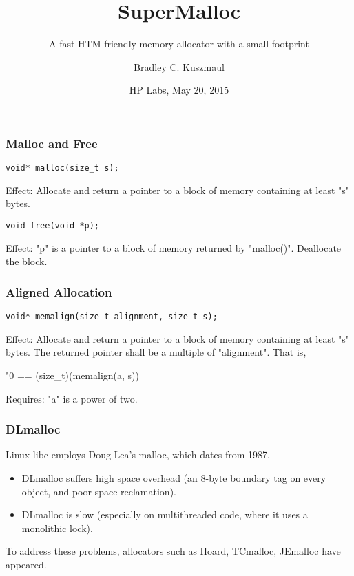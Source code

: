 \documentclass[xcolor=dvipsnames,14pt]{beamer}
\begin{document}
\title{SuperMalloc}
\subtitle{A fast HTM-friendly memory allocator with a small footprint}



\author{Bradley C. Kuszmaul}
\date{HP Labs, May  20, 2015}
\frame{\titlepage}

\begin{frame}[fragile]
\frametitle{Malloc and Free}
\begin{verbatim}
void* malloc(size_t s);
\end{verbatim}

Effect: Allocate and return a pointer to a block of memory containing at least "s" bytes.

\begin{verbatim}
void free(void *p);
\end{verbatim}

Effect: "p" is a pointer to a block of memory returned by "malloc()".  Deallocate the block.
\end{frame}

\begin{frame}[fragile]
\frametitle{Aligned Allocation}

\begin{verbatim}
void* memalign(size_t alignment, size_t s);
\end{verbatim}


Effect: Allocate and return a pointer to a block of memory containing at least "s" bytes.  
The returned pointer shall be a multiple of "alignment".  That is,
\begin{center}
"0 == (size_t)(memalign(a, s)) %
\end{center}

Requires: "a" is a power of two.
\end{frame}

\begin{frame}
\frametitle{DLmalloc}

Linux libc employs Doug Lea's malloc, which dates from 1987.

\begin{itemize}
\item DLmalloc suffers high space overhead (an 8-byte boundary tag on every object, and poor space reclamation).
\item DLmalloc is slow (especially on multithreaded code, where it uses a monolithic lock).
\end{itemize}

To address these problems, allocators such as Hoard, TCmalloc, JEmalloc have appeared.

\end{frame}
\end{document}
